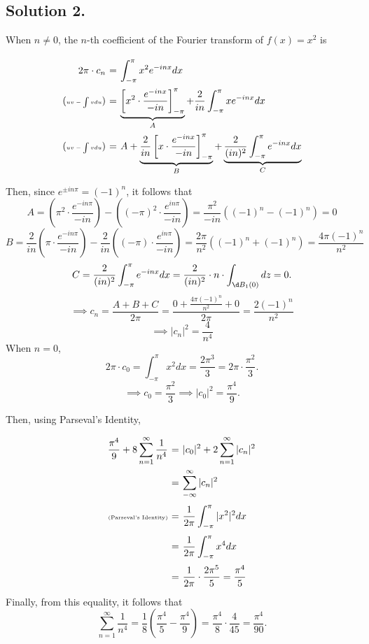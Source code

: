 \subsection*{Solution 2.}

When $n\neq 0$, the $n$-th coefficient of the Fourier transform of $f(x) = x^2$ is
\[ \everymath{\displaystyle}
\arraycolsep=1.8pt\def\arraystretch{2.5}
\begin{array}{rcl}
    2\pi \cdot c_n & = &  \int_{-\pi}^{\pi} x^2 e^{-inx} dx\\
    (\mbox{\tiny $\textstyle uv-\int vdu$})& = & \underbrace{\left[ x^2 \cdot \frac{e^{-inx}}{-in} \right]_{-\pi}^{\pi}}_{A} + \frac{2}{in} \int_{-\pi}^{\pi} x e^{-inx} dx\\
    (\mbox{\tiny $\textstyle uv-\int vdu$})& = & A + \underbrace{\frac{2}{in}\left[ x \cdot \frac{e^{-inx}}{-in} \right]_{-\pi}^{\pi}}_{B} + \underbrace{\frac{2}{(in)^2} \int_{-\pi}^{\pi}  e^{-inx} dx}_{C}\\
\end{array} \]

Then, since $e^{\pm i n\pi} = (-1)^n$, it follows that
\[ A = \left( \pi^2 \cdot \frac{e^{-in\pi}}{-in} \right) - \left( (-\pi)^2 \cdot \frac{e^{in\pi}}{-in} \right) = \frac{\pi^2}{-in}((-1)^n - (-1)^n) = 0 \]
\[ B = \frac{2}{in} \left( \pi \cdot \frac{e^{-in\pi}}{-in} \right) - \frac{2}{in} \left( (-\pi) \cdot \frac{e^{in\pi}}{-in} \right) = \frac{2\pi}{n^2}((-1)^n + (-1)^n) = \frac{4\pi (-1)^n}{n^2} \]
\[ C = \frac{2}{(in)^2} \int_{-\pi}^{\pi}  e^{-inx} dx = \frac{2}{(in)^2} \cdot n \cdot \int_{\d B_{1}(0)} dz = 0. \]
\[ \implies c_n = \frac{A + B + C}{2\pi} = \frac{0+\frac{4\pi (-1)^n}{n^2} + 0}{2\pi} = \frac{2(-1)^n}{n^2} \]
\[ \implies |c_n|^2 = \frac{4}{n^4} \]
When $n = 0$,
\[ 2\pi \cdot c_0 = \int_{-\pi}^{\pi} x^2 dx = \frac{2\pi^3}{3} = 2\pi \cdot \frac{\pi^2}{3}. \]
\[ \implies c_0 = \frac{\pi^2}{3} \implies |c_0|^2 = \frac{\pi^4}{9}. \]

Then, using Parseval's Identity,
\[ \everymath{\displaystyle}
\arraycolsep=1.8pt\def\arraystretch{2.5}
\begin{array}{rcl}
    \frac{\pi^4}{9} + 8 \sum_{n = 1}^{\infty} \frac{1}{n^4} & = & |c_0|^2 + 2 \sum_{n = 1}^{\infty} |c_n|^2\\
    & = & \sum_{-\infty}^{\infty} |c_n|^2\\
    \mbox{\tiny (Parseval's Identity)}& = & \frac{1}{2\pi}\int_{-\pi}^{\pi} |x^2|^2 dx\\
    & = & \frac{1}{2\pi} \int_{-\pi}^{\pi} x^4 dx\\
    & = & \frac{1}{2\pi} \cdot \frac{2\pi^5}{5} = \frac{\pi^4}{5}
\end{array} \]
Finally, from this equality, it follows that
\[ \sum_{n = 1}^{\infty} \frac{1}{n^4} = \frac{1}{8} \left( \frac{\pi^4}{5} - \frac{\pi^4}{9} \right) = \frac{\pi^4}{8} \cdot \frac{4}{45} = \frac{\pi^4}{90}. \]